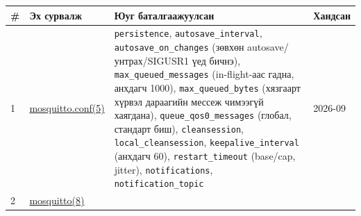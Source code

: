 \begingroup\scriptsize\begin{longtable}[]{@{}llll@{}}
\toprule
\begin{minipage}[b]{0.22\columnwidth}\raggedright
\#\strut
\end{minipage} & \begin{minipage}[b]{0.22\columnwidth}\raggedright
Эх сурвалж\strut
\end{minipage} & \begin{minipage}[b]{0.22\columnwidth}\raggedright
Юуг баталгаажуулсан\strut
\end{minipage} & \begin{minipage}[b]{0.22\columnwidth}\raggedright
Хандсан\strut
\end{minipage}\tabularnewline
\midrule
\endhead
\begin{minipage}[t]{0.22\columnwidth}\raggedright
1\strut
\end{minipage} & \begin{minipage}[t]{0.22\columnwidth}\raggedright
\href{https://mosquitto.org/man/mosquitto-conf-5.html}{mosquitto.conf(5)}\strut
\end{minipage} & \begin{minipage}[t]{0.22\columnwidth}\raggedright
\texttt{persistence}, \texttt{autosave\_\allowbreak{}interval}, \texttt{autosave\_\allowbreak{}on\_\allowbreak{}changes} (зөвхөн autosave/унтрах/SIGUSR1 үед бичнэ), \texttt{max\_\allowbreak{}queued\_\allowbreak{}messages} (in-flight-аас гадна, анхдагч 1000), \texttt{max\_\allowbreak{}queued\_\allowbreak{}bytes} (хязгаарт хүрвэл дараагийн мессеж чимээгүй хаягдана), \texttt{queue\_\allowbreak{}qos0\_\allowbreak{}messages} (глобал, стандарт биш), \texttt{cleansession}, \texttt{local\_\allowbreak{}cleansession}, \texttt{keepalive\_\allowbreak{}interval} (анхдагч 60), \texttt{restart\_timeout} (base/cap, jitter), \texttt{notifications}, \texttt{notification\_\allowbreak{}topic}\strut
\end{minipage} & \begin{minipage}[t]{0.22\columnwidth}\raggedright
2026-09\strut
\end{minipage}\tabularnewline
\begin{minipage}[t]{0.22\columnwidth}\raggedright
2\strut
\end{minipage} & \begin{minipage}[t]{0.22\columnwidth}\raggedright
\href{https://mosquitto.org/man/mosquitto-8.html}{mosquitto(8)}\strut
\end{minipage} & \begin{minipage}[t]{0.22\columnwidth}\raggedright

\end{minipage}
\end{longtable}
